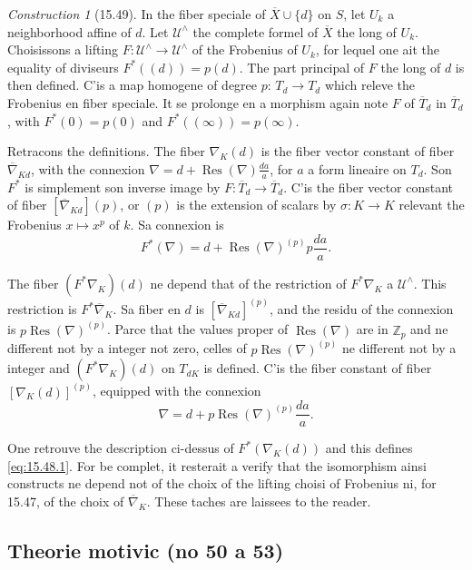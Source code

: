 \documentclass[12pt,a4paper]{article}
\theoremstyle{plain}
\theoremstyle{definition}
\theoremstyle{remark}
\newtheorem{construction}[theorem]{Construction}
\DeclareMathOperator{\Res}{Res}
\newcommand{\bZ}{\mathbb{Z}}
\begin{document}
\begin{construction}[15.49]
In the fiber speciale of $\overline{X} \cup \{d\}$ on $S$, let $U_k$ a neighborhood affine of $d$. Let $\mathcal{U}^\wedge$ the complete formel of $\overline{X}$ the long of $U_k$. Choisissons a lifting $F: \mathcal{U}^\wedge \to \mathcal{U}^\wedge$ of the Frobenius of $U_k$, for lequel one ait the equality of diviseurs $F^*((d)) = p(d)$. The part principal of $F$ the long of $d$ is then defined. C'is a map homogene of degree $p$: $T_d \to T_d$ which releve the Frobenius en fiber speciale. It se prolonge en a morphism again note $F$ of $\overline{T}_d$ in $\overline{T}_d$, with $F^*(0) = p(0)$ and $F^*((\infty)) = p(\infty)$.

Retracons the definitions. The fiber $\nabla_K(d)$ is the fiber vector constant of fiber $\overline{\nabla}_{Kd}$, with the connexion $\nabla = d + \Res(\nabla) \frac{da}{a}$, for $a$ a form lineaire on $T_d$. Son $F^*$ is simplement son inverse image by $F: \overline{T}_d \to \overline{T}_d$. C'is the fiber vector constant of fiber $[\overline{\nabla}_{Kd}](p)$, or $(p)$ is the extension of scalars by $\sigma: K \to K$ relevant the Frobenius $x \mapsto x^p$ of $k$. Sa connexion is
\[
F^*(\nabla) = d + \Res(\nabla)^{(p)} p \frac{da}{a}.
\]

The fiber $(F^* \nabla_K)(d)$ ne depend that of the restriction of $F^* \nabla_K$ a $\mathcal{U}^\wedge$. This restriction is $F^* \overline{\nabla}_K$. Sa fiber en $d$ is $[\overline{\nabla}_{Kd}]^{(p)}$, and the residu of the connexion is $p \Res(\nabla)^{(p)}$. Parce that the values proper of $\Res(\nabla)$ are in $\bZ_p$ and ne different not by a integer not zero, celles of $p \Res(\nabla)^{(p)}$ ne different not by a integer and $(F^* \nabla_K)(d)$ on $T_{dK}$ is defined. C'is the fiber constant of fiber $[\nabla_K(d)]^{(p)}$, equipped with the connexion
\[
\nabla = d + p \Res(\nabla)^{(p)} \frac{da}{a}.
\]

One retrouve the description ci-dessus of $F^*(\nabla_K(d))$ and this defines \eqref{eq:15.48.1}. For be complet, it resterait a verify that the isomorphism ainsi constructs ne depend not of the choix of the lifting choisi of Frobenius ni, for 15.47, of the choix of $\overline{\nabla}_K$. These taches are laissees to the reader.
\end{construction}


\subsection*{Theorie motivic (no 50 a 53)}
\end{document}
